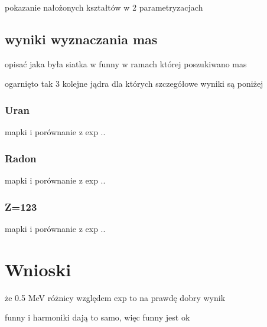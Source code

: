 \documentclass[polish]{article}
\numberwithin{equation}{section}
\begin{document}
pokazanie nałożonych kształtów w 2 parametryzacjach

\subsection{wyniki wyznaczania mas}

opisać jaka była siatka w funny w ramach której poszukiwano mas

ogarnięto tak 3 kolejne jądra dla których szczegółowe wyniki są poniżej

\subsubsection{Uran}
mapki i porównanie z exp .. 

\subsubsection{Radon}
mapki i porównanie z exp .. 

\subsubsection{Z=123}
mapki i porównanie z exp .. 


\section{Wnioski}

że 0.5 MeV różnicy względem exp to na prawdę dobry wynik

funny i harmoniki dają to samo, więc funny jest ok
\end{document}
